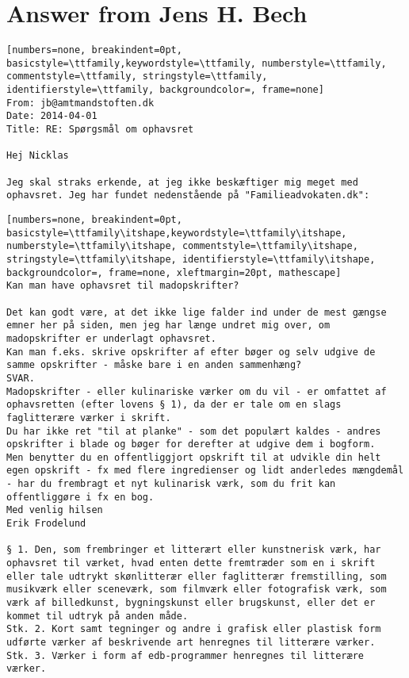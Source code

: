 \section*{Answer from Jens H. Bech}
\begin{lstlisting}[numbers=none, breakindent=0pt, basicstyle=\ttfamily,keywordstyle=\ttfamily, numberstyle=\ttfamily, commentstyle=\ttfamily, stringstyle=\ttfamily, identifierstyle=\ttfamily, backgroundcolor=, frame=none]
From: jb@amtmandstoften.dk
Date: 2014-04-01
Title: RE: Spørgsmål om ophavsret

Hej Nicklas
 
Jeg skal straks erkende, at jeg ikke beskæftiger mig meget med ophavsret. Jeg har fundet nedenstående på "Familieadvokaten.dk":
\end{lstlisting}
\begin{lstlisting}[numbers=none, breakindent=0pt, basicstyle=\ttfamily\itshape,keywordstyle=\ttfamily\itshape, numberstyle=\ttfamily\itshape, commentstyle=\ttfamily\itshape, stringstyle=\ttfamily\itshape, identifierstyle=\ttfamily\itshape, backgroundcolor=, frame=none, xleftmargin=20pt, mathescape]
Kan man have ophavsret til madopskrifter?

Det kan godt være, at det ikke lige falder ind under de mest gængse emner her på siden, men jeg har længe undret mig over, om madopskrifter er underlagt ophavsret.
Kan man f.eks. skrive opskrifter af efter bøger og selv udgive de samme opskrifter - måske bare i en anden sammenhæng?
SVAR.
Madopskrifter - eller kulinariske værker om du vil - er omfattet af ophavsretten (efter lovens § 1), da der er tale om en slags faglitterære værker i skrift.
Du har ikke ret "til at planke" - som det populært kaldes - andres opskrifter i blade og bøger for derefter at udgive dem i bogform.
Men benytter du en offentliggjort opskrift til at udvikle din helt egen opskrift - fx med flere ingredienser og lidt anderledes mængdemål - har du frembragt et nyt kulinarisk værk, som du frit kan offentliggøre i fx en bog.
Med venlig hilsen
Erik Frodelund

§ 1. Den, som frembringer et litterært eller kunstnerisk værk, har ophavsret til værket, hvad enten dette fremtræder som en i skrift eller tale udtrykt skønlitterær eller faglitterær fremstilling, som musikværk eller sceneværk, som filmværk eller fotografisk værk, som værk af billedkunst, bygningskunst eller brugskunst, eller det er kommet til udtryk på anden måde.
Stk. 2. Kort samt tegninger og andre i grafisk eller plastisk form udførte værker af beskrivende art henregnes til litterære værker.
Stk. 3. Værker i form af edb-programmer henregnes til litterære værker.
\end{lstlisting}
